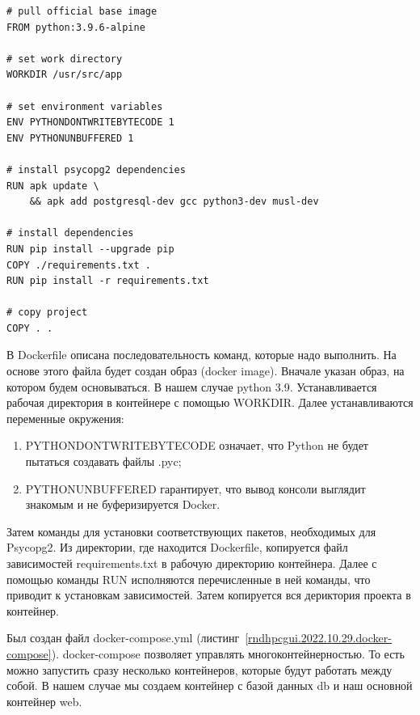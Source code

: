 \begin{lstlisting}[frame=single,label={rndhpcgui.2022.10.29.dockerfile},caption={Dockerfile},language={docker}] 
# pull official base image
FROM python:3.9.6-alpine

# set work directory
WORKDIR /usr/src/app

# set environment variables
ENV PYTHONDONTWRITEBYTECODE 1
ENV PYTHONUNBUFFERED 1

# install psycopg2 dependencies
RUN apk update \
    && apk add postgresql-dev gcc python3-dev musl-dev

# install dependencies
RUN pip install --upgrade pip
COPY ./requirements.txt .
RUN pip install -r requirements.txt

# copy project
COPY . .
\end{lstlisting}

В \textsf{Dockerfile} описана последовательность команд, которые надо выполнить. На основе этого файла будет создан образ (\textsf{docker image}). Вначале указан образ, на котором будем основываться. В нашем случае \textsf{python 3.9}. Устанавливается рабочая директория в контейнере с помощью \textsf{WORKDIR}. Далее устанавливаются переменные окружения:

\begin{enumerate}
	\item \textsf{PYTHONDONTWRITEBYTECODE} означает, что \textsf{Python} не будет пытаться создавать файлы \textsf{.pyc};
	\item \textsf{PYTHONUNBUFFERED} гарантирует, что вывод консоли выглядит знакомым и не буферизируется Docker.
\end{enumerate}

Затем команды для установки соответствующих пакетов, необходимых для \textsf{Psycopg2}. Из директории, где находится \textsf{Dockerfile}, копируется файл зависимостей \textsf{requirements.txt} в рабочую директорию контейнера. Далее с помощью команды \textsf{RUN} исполняются перечисленные в ней команды, что приводит к установкам зависимостей. Затем копируется вся дериктория проекта в контейнер. 

Был создан файл \textsf{docker-compose.yml} (листинг~\ref{rndhpcgui.2022.10.29.docker-compose}). \textsf{docker-compose} позволяет управлять многоконтейнерностью. То есть можно запустить сразу несколько контейнеров, которые будут работать между собой. В нашем случае мы создаем контейнер с базой данных \textsf{db} и наш основной контейнер \textsf{web}.

